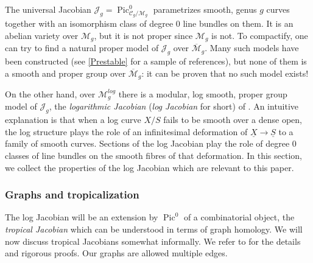 \documentclass[a4paper,11pt]{amsart} %
\numberwithin{equation}{subsection}
\newcommand{\on}[1]{\operatorname{#1}}
\newcommand{\bb}[1]{{\mathbb{#1}}}
\newcommand{\ca}[1]{{\mathcal{#1}}}
\newcommand{\ul}[1]{{\underline{#1}}}
\def\Pic{\operatorname{Pic}}
\def\o#1{\overline{#1}}
\theoremstyle{definition}
\theoremstyle{plain}%
\theoremstyle{remark}
\newtheorem{remark}[definition]{Remark}
\begin{document}
The universal Jacobian $\ca J_g = \Pic^0_{\ca C_g/\ca M_g}$ parametrizes smooth, genus $g$ curves together with an isomorphism class of degree $0$ line bundles on them. It is an abelian variety over $\ca M_g$, but it is not proper since $\ca M_g$ is not. To compactify, one can try to find a natural proper model of $\ca J_g$ over $\o {\ca M}_g$. Many such models have been constructed (see \ref{Prestable} for a sample of references), but none of them is a smooth and proper group over $\o{\ca M}_g$: it can be proven that no such model exists!

On the other hand, over $\ca M_g^{log}$ there is a modular, log smooth, proper group model of $\ca J_g$, the \emph{logarithmic Jacobian} (\emph{log Jacobian} for short) of \cite{molcho_wise_2022}. An intuitive explanation is that when a log curve $X/S$ fails to be smooth over a dense open, the log structure plays the role of an infinitesimal deformation of $\ul X \to \ul S$ to a family of smooth curves. Sections of the log Jacobian play the role of degree $0$ classes of line bundles on the smooth fibres of that deformation. In this section, we collect the properties of the log Jacobian which are relevant to this paper.

\subsubsection{Graphs and tropicalization}

The log Jacobian will be an extension by $\Pic^0$ of a combinatorial object, the \emph{tropical Jacobian} which can be understood in terms of graph homology. We will now discuss tropical Jacobians somewhat informally. We refer to \cite{molcho_wise_2022} for the details and rigorous proofs. Our graphs are allowed multiple edges.


\end{document}
